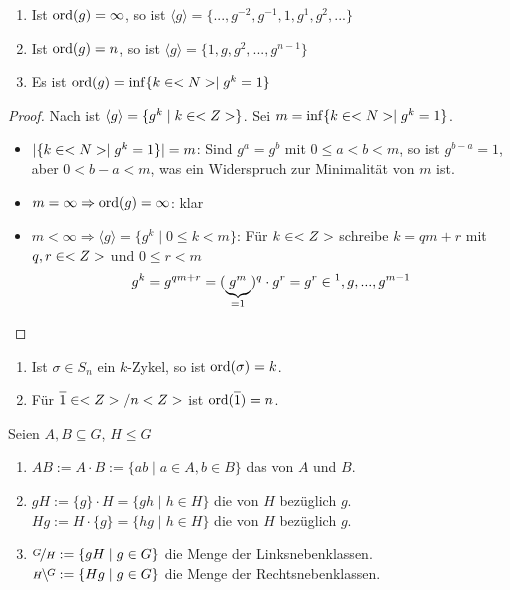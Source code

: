 \begin{proposition}
	\begin{enumerate}[label=(\alph*)]
		\item Ist $\operatorname{ord}(g)=\infty$, so ist $\langle g\rangle=\{...,g^{-2},g^{-1},1,g^1,g^2,...\}$
		\item Ist $\operatorname{ord}(g)=n$, so ist $\langle g\rangle=\{1,g,g^2,...,g^{n-1}\}$
		\item Es ist $\operatorname{ord}(g)=\inf\{k\in<N>\mid g^k=1\}$
	\end{enumerate}
\end{proposition}
\begin{proof}
	Nach  ist $\langle g\rangle=\{g^k\mid k\in<Z>\}$. Sei $m=\inf\{k\in<N>\mid g^k=1\}$.
	\begin{itemize}
		\item $\vert\{k\in<N>\mid g^k=1\}\vert=m$: Sind $g^a=g^b$ mit $0\le a<b<m$, so ist $g^{b-a}=1$, aber $0<b-a<m$, was ein Widerspruch zur Minimalität von $m$ ist.
		\item $m=\infty\Rightarrow\operatorname{ord}(g)=\infty$: klar
		\item $m<\infty\Rightarrow\langle g\rangle=\{g^k\mid 0\le k<m\}$: Für $k\in<Z>$ schreibe $k=qm+r$ mit $q,r\in<Z>$ und $0\le r<m$
		\begin{align}
			g^k=g^{qm+r}=(\underbrace{g^m}_{=1})^q\cdot g^r=g^r\in{^1,g,...,g^{m-1}}\notag
		\end{align}
	\end{itemize}
\end{proof}

\begin{example}
	\begin{enumerate}[label=(\alph*)]
		\item Ist $\sigma\in S_n$ ein $k$-Zykel, so ist $\operatorname{ord}(\sigma)=k$.
		\item Für $\overline{1}\in\whole/n\whole$ ist $\ord(\overline{1})=n$.
	\end{enumerate}
\end{example}

\begin{definition}
	Seien $A,B\subseteq G$, $H\le G$
	\begin{enumerate}[label=(\alph*)]
		\item $AB:=A\cdot B:=\{ab\mid a\in A,b\in B\}$ das  von $A$ und $B$.
		\item $gH:=\{g\}\cdot H=\{gh\mid h\in H\}$ die  von $H$ bezüglich $g$. \\
		$Hg:=H\cdot \{g\}=\{hg\mid h\in H\}$ die  von $H$ bezüglich $g$.
		\item $\nicefrac{G}{H}:=\{gH\mid g\in G\}$ die Menge der Linksnebenklassen. \\
		$\rnkset{G}{H}:=\{Hg\mid g\in G\}$ die Menge der Rechtsnebenklassen.
	\end{enumerate}
\end{definition}

